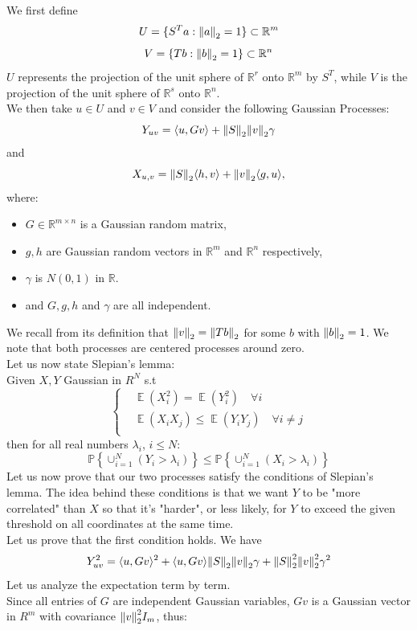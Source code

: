 \documentclass[12pt,letterpaper]{article}
\newcommand{\R}{\mathbb{R}}
\renewcommand{\le}{\leqslant}
\newcommand{\snorm}[1]{\norm{#1}_2}
\newcommand{\snormsq}[1]{\snorm{#1}^2}
\newcommand{\Expect}{\operatorname{\mathbb{E}}}
\newcommand{\Prob}[1]{\mathbb{P}\left\{ #1 \right\}}
\begin{document}
\begin{enumerate}
We first define
$$
U= \{S^Ta:\snorm{a} = 1\} \subset \R^m
$$
$$
V= \{Tb: \snorm{b} = 1\} \subset \R^n
$$
$U$ represents the projection of the unit sphere of $\R^r$ onto $\R^m$ by $S^T$, while $V$ is the projection of the unit sphere of $\R^s$ onto $\R^n$.\\
We then take $u\in U$ and $v \in V$ and consider the following Gaussian Processes:
$$
Y_{uv} = \langle u,Gv\rangle + \snorm{S}\snorm{v}\gamma
$$
and 
$$
X_{u,v} = \snorm{S}\langle h,v \rangle + \snorm{v}\langle g,u\rangle,
$$
where:
\begin{itemize}
    \item $G\in \R^{m\times n}$ is a Gaussian random matrix,
    \item $g,h$ are Gaussian random vectors in $\R^m$ and $\R^n$ respectively,
    \item $\gamma$ is $N(0,1)$ in $\R$.
    \item and $G,g,h$ and $\gamma$ are all independent.
\end{itemize}
We recall from its definition that $\snorm{v} = \snorm{Tb}$ for some $b$ with $\snorm{b}=1$. We note that both processes are centered processes around zero.\\
Let us now state Slepian's lemma:\\
Given $X,Y$ Gaussian in $R^N$ s.t
$$
\begin{cases}
    &\Expect(X_i^2) = \Expect(Y_i^2) \quad \forall i\\
    & \Expect(X_iX_j) \le \Expect(Y_iY_j) \quad \forall i \ne j\\
\end{cases}
$$
then for all real numbers $\lambda_i$, $i\le N$:
$$
\Prob{\cup_{i=1}^N(Y_i>\lambda_i)}
\le
\Prob{\cup_{i=1}^N(X_i>\lambda_i)} 
$$
Let us now prove that our two processes satisfy the conditions of Slepian's lemma. The idea behind these conditions is that we want $Y$ to be "more correlated" than $X$ so that it's "harder", or less likely, for $Y$ to exceed the given threshold on all coordinates at the same time.\\
Let us prove that the first condition holds. We have 
$$
Y_{uv}^2 = \langle u,Gv\rangle^2 +\langle u,Gv\rangle \snorm{S}\snorm{v}\gamma + \snorm{S}^2\snorm{v}^2\gamma^2
$$
Let us analyze the expectation term by term.\\
Since all entries of $G$ are independent Gaussian variables, $Gv$ is a Gaussian vector in $R^m$ with covariance $\snormsq{v}I_m$, thus:

\end{enumerate}
\end{document}

